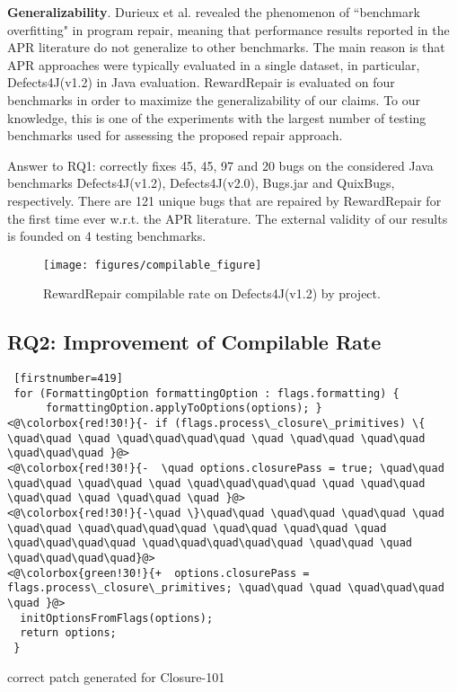 \textbf{Generalizability}.
Durieux et al. \cite{Durieux:2019:RepairThemAll} revealed the phenomenon of ``benchmark overfitting" in program repair, meaning that performance results reported in the APR literature do not generalize to other benchmarks. The main reason is that APR approaches were typically evaluated in a single dataset, in particular, Defects4J(v1.2) in Java evaluation. 
RewardRepair is evaluated on four benchmarks in order to maximize the generalizability of our claims. 
To our knowledge, this is one of the experiments with the largest number of testing benchmarks used for assessing the proposed repair approach. 

\vspace{0.2cm}

\begin{mdframed}
Answer  to  RQ1: 
\approach  correctly fixes 45, 45, 97 and 20 bugs on the considered Java benchmarks Defects4J(v1.2), Defects4J(v2.0), Bugs.jar and QuixBugs, respectively.
There are 121 unique bugs that are repaired by RewardRepair for the
first time ever w.r.t. the APR literature.
The external validity of our results is founded on 4 testing benchmarks.
\end{mdframed}

\begin{figure}[t!]
     \texttt{[image: figures/compilable\_figure]}
     \caption{RewardRepair compilable rate on Defects4J(v1.2) by project.}
     \label{fig:compilable-rate}
\end{figure}

\vspace{1cm}

\subsection{RQ2: Improvement of Compilable Rate}

\begin{listing}[t!]
\noindent\begin{minipage}[b]{0.49\textwidth}
\begin{lstlisting} [firstnumber=419] 
 for (FormattingOption formattingOption : flags.formatting) {        
      formattingOption.applyToOptions(options); }
<@\colorbox{red!30!}{- if (flags.process\_closure\_primitives) \{ \quad\quad \quad \quad\quad\quad\quad \quad \quad\quad \quad\quad \quad\quad\quad }@>
<@\colorbox{red!30!}{-  \quad options.closurePass = true; \quad\quad \quad\quad \quad\quad \quad \quad\quad\quad\quad \quad \quad\quad \quad\quad \quad \quad\quad \quad }@>
<@\colorbox{red!30!}{-\quad \}\quad\quad \quad\quad \quad\quad \quad \quad\quad \quad\quad\quad\quad \quad\quad \quad\quad \quad \quad\quad\quad\quad \quad\quad\quad\quad\quad \quad\quad \quad \quad\quad\quad\quad}@>
<@\colorbox{green!30!}{+  options.closurePass = flags.process\_closure\_primitives; \quad\quad \quad \quad\quad\quad \quad }@>
  initOptionsFromFlags(options);
  return options;
 }
\end{lstlisting}
\end{minipage}%
\caption{\approach correct patch generated for Closure-101}
\label{lst:closure-101}
\end{listing}

